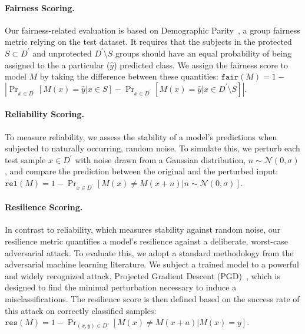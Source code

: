 \documentclass[sigconf]{acmart}
\begin{document}
\paragraph{Fairness Scoring. }

Our fairness-related evaluation is based on Demographic Parity~\cite{calders2009building}, a group fairness metric relying on the test dataset. It requires that the subjects in the protected $S\subset D^\prime$ and unprotected $D^\prime \setminus S$ groups should have an equal probability of being assigned to the a particular ($\hat{y}$) predicted class. We assign the fairness score to model $M$ by taking the difference between these quantities: $\mathtt{fair}(M)=1-$\\
$\left|\Pr_{x\in D^\prime}[M(x)=\hat{y} | x\in S] -\Pr_{x\in D^\prime}[M(x)=\hat{y} | x\in D^\prime \setminus S]\right|$.

\paragraph{Reliability Scoring. }

To measure reliability, we assess the stability of a model's predictions when subjected to naturally occurring, random noise. To simulate this, we perturb each test sample $x\in D^\prime$ with noise drawn from a Gaussian distribution, $n\sim \mathcal{N}(0,\sigma)$, and compare the prediction between the original and the perturbed input: \\
$\mathtt{rel}(M)=1 - \Pr_{x\in D^\prime}[M(x) \neq M(x+n)|n\sim\mathcal{N}(0,\sigma)]$.

\paragraph{Resilience Scoring. }

In contrast to reliability, which measures stability against random noise, our resilience metric quantifies a model's resilience against a deliberate, worst-case adversarial attack. To evaluate this, we adopt a standard methodology from the adversarial machine learning literature. We subject a trained model to a powerful and widely recognized attack, Projected Gradient Descent (PGD)~\cite{madry2017towards}, which is designed to find the minimal perturbation necessary to induce a misclassifications. The resilience score is then defined based on the success rate of this attack on correctly classified samples: \\
$\mathtt{res}(M)=1-\Pr_{(x,y) \in D'}[M(x) \neq M(x+a)|M(x)=y]$.
\end{document}
